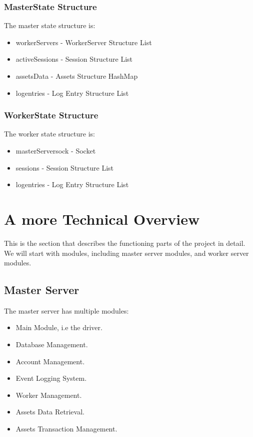 \documentclass[a4paper]{article}
\begin{document}
\subsubsection{MasterState Structure}
\label{ds_masterstate}
The master state structure is:
\begin{itemize}
	\item workerServers - WorkerServer Structure List
	\item activeSessions - Session Structure List
	\item assetsData - Assets Structure HashMap
	\item logentries - Log Entry Structure List
\end{itemize}

\subsubsection{WorkerState Structure}
\label{ds_workerstate}
The worker state structure is:
\begin{itemize}
	\item masterServersock - Socket
	\item sessions - Session Structure List
	\item logentries - Log Entry Structure List
\end{itemize}

\section{A more Technical Overview}
This is the section that describes the functioning parts of the project in
detail. We will start with modules, including master server modules, and worker
server modules.

\subsection{Master Server}
The master server has multiple modules:
\begin{itemize}
	\item Main Module, i.e the driver.
	\item Database Management.
	\item Account Management.
	\item Event Logging System.
	\item Worker Management.
	\item Assets Data Retrieval.
	\item Assets Transaction Management.
\end{itemize}
\end{document}
